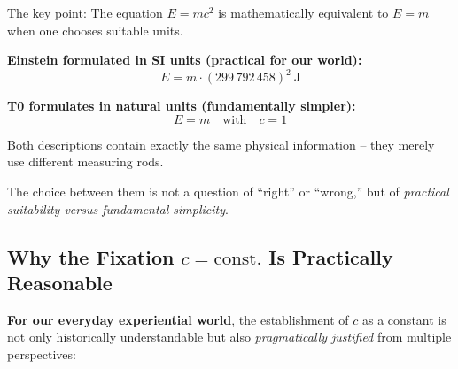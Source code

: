 	\begin{tcolorbox}[colback=blue!10!white,colframe=blue!75!black,title=The Pragmatic Perspective: Unit Systems and Conventions]
		The key point: The equation \( E = mc^2 \) is mathematically equivalent to \( E = m \) when one chooses suitable units.
		
		\textbf{Einstein formulated in SI units (practical for our world):}
		\begin{equation}
			E = m \cdot (299\,792\,458)^2 \ \text{J} 
		\end{equation}
		
		\textbf{T0 formulates in natural units (fundamentally simpler):}
		\begin{equation}
			E = m \quad \text{with} \quad c = 1
		\end{equation}
		
		Both descriptions contain exactly the same physical information – they merely use different measuring rods.
		
		The choice between them is not a question of ``right'' or ``wrong,'' but of \textit{practical suitability versus fundamental simplicity}.
	\end{tcolorbox}
	
	\subsection{Why the Fixation \( c = \text{const.} \) Is Practically Reasonable}
	
	\textbf{For our everyday experiential world}, the establishment of \( c \) as a constant is not only historically understandable but also \textit{pragmatically justified} from multiple perspectives:
	
